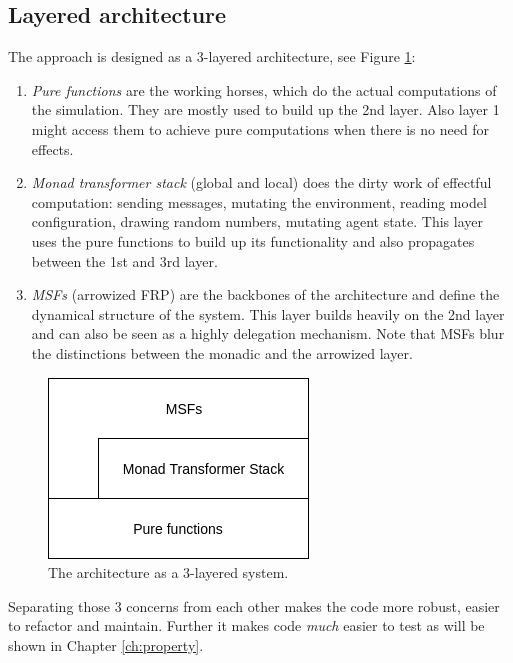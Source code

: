 \subsection{Layered architecture}
The approach is designed as a 3-layered architecture, see Figure \ref{fig:3layer_system}:
\begin{enumerate}
	\item \textit{Pure functions} are the working horses, which do the actual computations of the simulation. They are mostly used to build up the 2nd layer. Also layer 1 might access them to achieve pure computations when there is no need for effects.
	\item \textit{Monad transformer stack} (global and local) does the dirty work of effectful computation: sending messages, mutating the environment, reading model configuration, drawing random numbers, mutating agent state. This layer uses the pure functions to build up its functionality and also propagates between the 1st and 3rd layer.
	\item \textit{MSFs} (arrowized FRP) are the backbones of the architecture and define the dynamical structure of the system. This layer builds heavily on the 2nd layer and can also be seen as a highly delegation mechanism. Note that MSFs blur the distinctions between the monadic and the arrowized layer.
\end{enumerate}

\begin{figure}
	\centering
	\includegraphics[width=.4\textwidth, angle=0]{./fig/eventdriven/3layers.png}
	\caption{The architecture as a 3-layered system.}
	\label{fig:3layer_system}
\end{figure}

Separating those 3 concerns from each other makes the code more robust, easier to refactor and maintain. Further it makes code \textit{much} easier to test as will be shown in Chapter \ref{ch:property}. 


